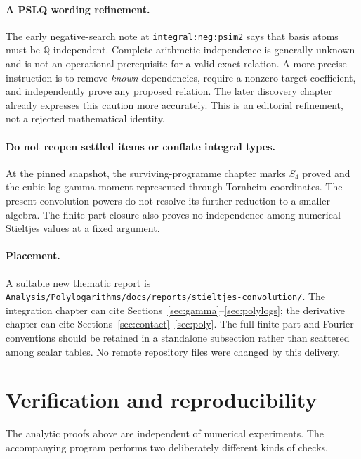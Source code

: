 \documentclass[11pt]{article}
\numberwithin{equation}{section}
\theoremstyle{definition}
\theoremstyle{remark}
\newcommand{\Q}{\mathbb Q}
\begin{document}
\paragraph{A PSLQ wording refinement.}
The early negative-search note at
\texttt{integral:neg:psim2} says that basis atoms must be
$\Q$-independent. Complete arithmetic independence is generally unknown
and is not an operational prerequisite for a valid exact relation.
A more precise instruction is to remove \emph{known} dependencies,
require a nonzero target coefficient, and independently prove any proposed
relation. The later discovery chapter already expresses this caution
more accurately. This is an editorial refinement, not a rejected
mathematical identity.

\paragraph{Do not reopen settled items or conflate integral types.}
At the pinned snapshot, the surviving-programme chapter marks $S_4$
proved and the cubic log-gamma moment represented through Tornheim
coordinates. The present convolution powers do not resolve its further
reduction to a smaller algebra. The finite-part closure also proves no
independence among numerical Stieltjes values at a fixed argument.

\paragraph{Placement.}
A suitable new thematic report is
\nolinkurl{Analysis/Polylogarithms/docs/reports/stieltjes-convolution/}.
The integration chapter can cite Sections~\ref{sec:gamma}--\ref{sec:polylogs};
the derivative chapter can cite Sections~\ref{sec:contact}--\ref{sec:poly}.
The full finite-part and Fourier conventions should be retained in a
standalone subsection rather than scattered among scalar tables. No
remote repository files were changed by this delivery.

\section{Verification and reproducibility}
\label{sec:verification}
The analytic proofs above are independent of numerical experiments.
The accompanying program performs two deliberately different kinds of
checks.
\end{document}
